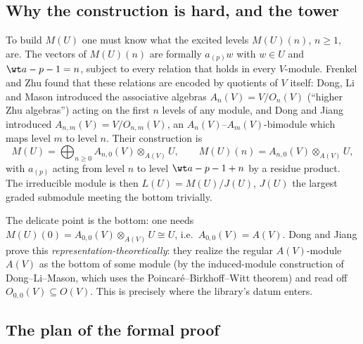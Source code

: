 \subsection{Why the construction is hard, and the tower}

To build $M(U)$ one must know what the excited levels $M(U)(n)$, $n\ge1$, are. The vectors of $M(U)(n)$ are formally
$a_{(p)}w$ with $w\in U$ and $\wt a - p - 1 = n$, subject to every relation that holds in every $V$-module. Frenkel and
Zhu found that these relations are encoded by quotients of $V$ itself: Dong, Li and Mason introduced the associative
algebras $A_n(V) = V/O_n(V)$ (``higher Zhu algebras'') acting on the first $n$ levels of any module, and Dong and Jiang
introduced $A_{n,m}(V) = V/O_{n,m}(V)$, an $A_n(V)$--$A_m(V)$-bimodule which maps level $m$ to level $n$. Their
construction is
\begin{equation}\label{l13:eq:MU}
 M(U) = \bigoplus_{n\ge0} A_{n,0}(V)\otimes_{A(V)}U,\qquad M(U)(n) = A_{n,0}(V)\otimes_{A(V)}U,
\end{equation}
with $a_{(p)}$ acting from level $n$ to level $\wt a-p-1+n$ by a residue product. The irreducible module is then
$L(U) = M(U)/J(U)$, $J(U)$ the largest graded submodule meeting the bottom trivially.

The delicate point is the bottom: one needs $M(U)(0) = A_{0,0}(V)\otimes_{A(V)}U\cong U$, i.e.\ $A_{0,0}(V) = A(V)$.
Dong and Jiang prove this \emph{representation-theoretically}: they realize the regular $A(V)$-module $A(V)$ as the
bottom of some module (by the induced-module construction of Dong--Li--Mason, which uses the
Poincar\'e--Birkhoff--Witt theorem) and read off $O_{0,0}(V)\subseteq O(V)$. This is precisely where the library's
datum  enters.

\subsection{The plan of the formal proof}

